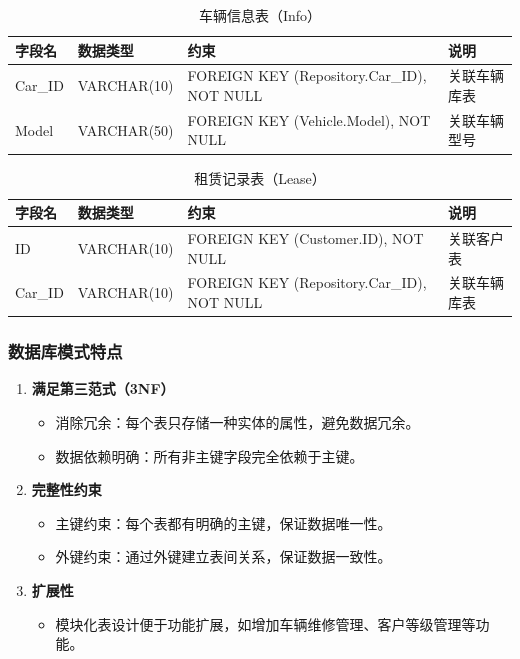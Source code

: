 \documentclass[UTF8,a4paper,12pt]{ctexart}
\begin{document}
\begin{table}[h!]
    \centering
    \caption{车辆信息表（Info）}
\begin{tabular}{|l|l|l|l|}
\hline
字段名 & 数据类型 & 约束 & 说明 \\
\hline
Car\_ID & VARCHAR(10) & FOREIGN KEY (Repository.Car\_ID), NOT NULL & 关联车辆库表 \\
\hline
Model & VARCHAR(50) & FOREIGN KEY (Vehicle.Model), NOT NULL & 关联车辆型号 \\
\hline
\end{tabular}
\end{table}


\begin{table}[h!]
    \centering
    \caption{租赁记录表（Lease）}
\begin{tabular}{|l|l|l|l|}
\hline
字段名 & 数据类型 & 约束 & 说明 \\
\hline
ID & VARCHAR(10) & FOREIGN KEY (Customer.ID), NOT NULL & 关联客户表 \\
\hline
Car\_ID & VARCHAR(10) & FOREIGN KEY (Repository.Car\_ID), NOT NULL & 关联车辆库表 \\
\hline
\end{tabular}
\end{table}

\subsubsection{数据库模式特点}

\begin{enumerate}
    \item \textbf{满足第三范式（3NF）}
    \begin{itemize}
        \item 消除冗余：每个表只存储一种实体的属性，避免数据冗余。
        \item 数据依赖明确：所有非主键字段完全依赖于主键。
    \end{itemize}
    \item \textbf{完整性约束}
    \begin{itemize}
        \item 主键约束：每个表都有明确的主键，保证数据唯一性。
        \item 外键约束：通过外键建立表间关系，保证数据一致性。
    \end{itemize}
    \item \textbf{扩展性}
    \begin{itemize}
        \item 模块化表设计便于功能扩展，如增加车辆维修管理、客户等级管理等功能。
    \end{itemize}
\end{enumerate}
\end{document}
